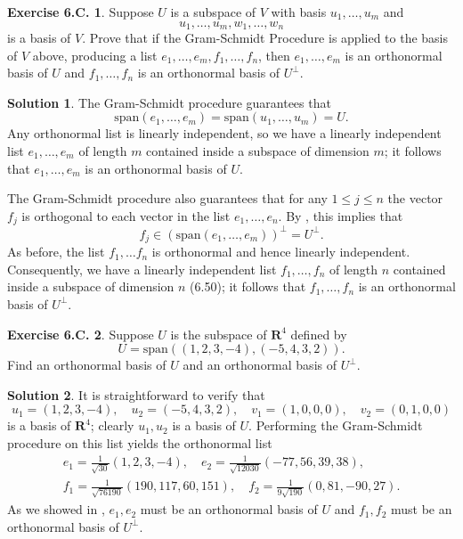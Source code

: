 \documentclass[12pt]{article}
\theoremstyle{definition}
\theoremstyle{exercise}
\newtheorem{exercise}{Exercise 6.C.}
\theoremstyle{solution}
\newtheorem*{solution}{Solution}
\newcommand{\Span}{\text{span}}
\newcommand{\ocomp}[1]{#1^{\perp}}
\newcommand{\R}{\mathbf{R}}
\begin{document}
\begin{exercise}
\label{ex:3}
    Suppose \( U \) is a subspace of \( V \) with basis \( u_1, \ldots, u_m \) and
    \[
        u_1, \ldots, u_m, w_1, \ldots, w_n
    \]
    is a basis of \( V \). Prove that if the Gram-Schmidt Procedure is applied to the basis of \( V \) above, producing a list \( e_1, \ldots, e_m, f_1, \ldots, f_n \), then \( e_1, \ldots, e_m \) is an orthonormal basis of \( U \) and \( f_1, \ldots, f_n \) is an orthonormal basis of \( \ocomp{U} \).
\end{exercise}

\begin{solution}
    The Gram-Schmidt procedure guarantees that
    \[
        \Span(e_1, \ldots, e_m) = \Span(u_1, \ldots, u_m) = U.
    \]
    Any orthonormal list is linearly independent, so we have a linearly independent list \( e_1, \ldots, e_m \) of length \( m \) contained inside a subspace of dimension \( m \); it follows that \( e_1, \ldots, e_m \) is an orthonormal basis of \( U \).

    The Gram-Schmidt procedure also guarantees that for any \( 1 \leq j \leq n \) the vector \( f_j \) is orthogonal to each vector in the list \( e_1, \ldots, e_n \). By , this implies that
    \[
        f_j \in \ocomp{(\Span(e_1, \ldots, e_m))} = \ocomp{U}.
    \]
    As before, the list \( f_1, \ldots f_n \) is orthonormal and hence linearly independent. Consequently, we have a linearly independent list \( f_1, \ldots, f_n \) of length \( n \) contained inside a subspace of dimension \( n \) (6.50); it follows that \( f_1, \ldots, f_n \) is an orthonormal basis of \( \ocomp{U} \).
\end{solution}

\begin{exercise}
\label{ex:4}
    Suppose \( U \) is the subspace of \( \R^4 \) defined by
    \[
        U = \Span((1, 2, 3, -4), (-5, 4, 3, 2)).
    \]
    Find an orthonormal basis of \( U \) and an orthonormal basis of \( \ocomp{U} \).
\end{exercise}

\begin{solution}
    It is straightforward to verify that
    \[
        u_1 = (1, 2, 3, -4), \quad u_2 = (-5, 4, 3, 2), \quad v_1 = (1, 0, 0, 0), \quad v_2 = (0, 1, 0, 0)
    \]
    is a basis of \( \R^4 \); clearly \( u_1, u_2 \) is a basis of \( U \). Performing the Gram-Schmidt procedure on this list yields the orthonormal list
    \begin{multline*}
        e_1 = \frac{1}{\sqrt{30}} (1, 2, 3, -4), \quad e_2 = \frac{1}{\sqrt{12030}} (-77, 56, 39, 38), \\[2mm]
        f_1 = \frac{1}{\sqrt{76190}} (190, 117, 60, 151), \quad f_2 = \frac{1}{9 \sqrt{190}} (0, 81, -90, 27).
    \end{multline*}
    As we showed in , \( e_1, e_2 \) must be an orthonormal basis of \( U \) and \( f_1, f_2 \) must be an orthonormal basis of \( \ocomp{U} \).
\end{solution}
\end{document}
